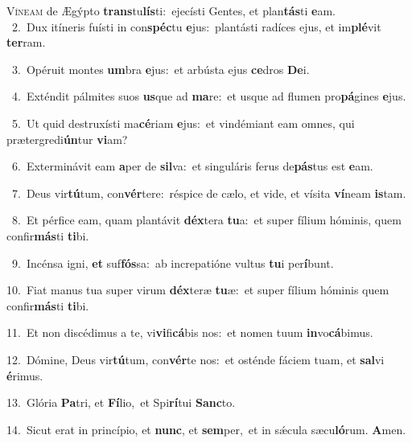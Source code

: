 \lettrine{\initial\textcolor{\initialcolor}{V}}{íneam} de Ægýpto \textbf{trans}\-tu\-\textbf{lís}\-ti:~\star ejecísti Gentes, et plan\-\textbf{tás}\-ti \textbf{e}\-am.\\
{\numbfont\textcolor{\numbcolor}{~2.}}~Dux itíneris fuísti in con\-\textbf{spéc}\-tu \textbf{e}\-jus:~\star plantásti radíces ejus, et im\-\textbf{plé}\-vit \textbf{ter}\-ram.\par
{\numbfont\textcolor{\numbcolor}{~3.}}~Opéruit montes \textbf{um}\-bra \textbf{e}\-jus:~\star et arbústa ejus \textbf{ce}\-dros \textbf{De}\-i.\par
{\numbfont\textcolor{\numbcolor}{~4.}}~Exténdit pálmites suos \textbf{us}\-que ad \textbf{ma}\-re:~\star et usque ad flumen pro\-\textbf{pá}\-gines \textbf{e}\-jus.\par
{\numbfont\textcolor{\numbcolor}{~5.}}~Ut quid destruxísti ma\-\textbf{cé}\-riam \textbf{e}\-jus:~\star et vindémiant eam omnes, qui prætergredi\-\textbf{ún}\-tur \textbf{vi}\-am?\par
{\numbfont\textcolor{\numbcolor}{~6.}}~Exterminávit eam \textbf{a}\-per de \textbf{sil}\-va:~\star et singuláris ferus de\-\textbf{pás}\-tus est \textbf{e}\-am.\par
{\numbfont\textcolor{\numbcolor}{~7.}}~Deus vir\-\textbf{tú}\-tum, con\-\textbf{vér}\-tere:~\star réspice de cælo, et vide, et vísita \textbf{ví}\-neam \textbf{is}\-tam.\par
{\numbfont\textcolor{\numbcolor}{~8.}}~Et pérfice eam, quam plantávit \textbf{déx}\-tera \textbf{tu}\-a:~\star et super fílium hóminis, quem confir\-\textbf{más}\-ti \textbf{ti}\-bi.\par
{\numbfont\textcolor{\numbcolor}{~9.}}~Incénsa igni, \textbf{et} suf\-\textbf{fós}\-sa:~\star ab increpatióne vultus \textbf{tu}\-i per\-\textbf{í}\-bunt.\par
{\numbfont\textcolor{\numbcolor}{10.}}~Fiat manus tua super virum \textbf{déx}\-teræ \textbf{tu}\-æ:~\star et super fílium hóminis quem confir\-\textbf{más}\-ti \textbf{ti}\-bi.\par
{\numbfont\textcolor{\numbcolor}{11.}}~Et non discédimus a te, vi\-\textbf{vi}\-fi\-\textbf{cá}\-bis nos:~\star et nomen tuum \textbf{in}\-vo\-\textbf{cá}\-bimus.\par
{\numbfont\textcolor{\numbcolor}{12.}}~Dómine, Deus vir\-\textbf{tú}\-tum, con\-\textbf{vér}\-te nos:~\star et osténde fáciem tuam, et \textbf{sal}\-vi \textbf{é}\-rimus.\par
{\numbfont\textcolor{\numbcolor}{13.}}~Glória \textbf{Pa}\-tri, et \textbf{Fí}\-lio,~\star et Spi\-\textbf{rí}\-tui \textbf{Sanc}\-to.\par
{\numbfont\textcolor{\numbcolor}{14.}}~Sicut erat in princípio, et \textbf{nunc}\-, et \textbf{sem}\-per,~\star et in sǽcula sæcu\-\textbf{ló}\-rum. \textbf{A}\-men.\par
